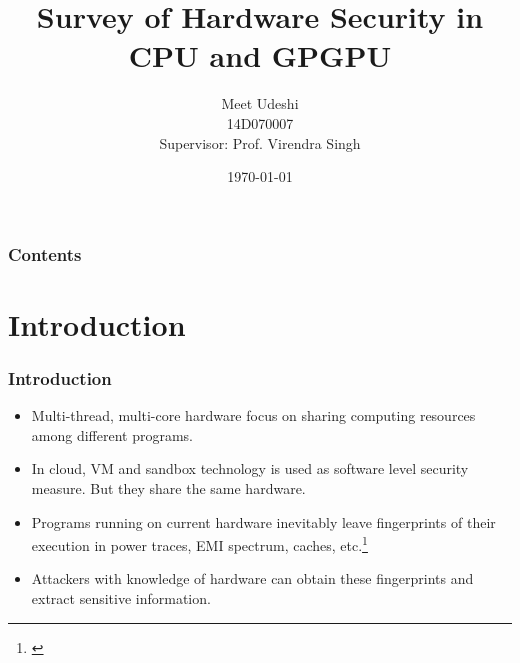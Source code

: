 \documentclass[10pt]{beamer}
\title[DDP Phase 1]{Survey of Hardware Security in CPU and GPGPU} %
\author{Meet Udeshi\\
14D070007\\
Supervisor: Prof. Virendra Singh} %
\institute[CADSL] %
{
CADSL - IIT Bombay\\ %
}
\date{\today} %
\begin{document}
\begin{frame}
\titlepage %
\end{frame}

\begin{frame}
\frametitle{Contents} %
\tableofcontents %
\end{frame}

\section{Introduction}


\begin{frame}
\frametitle{Introduction}
\begin{itemize}
    \item Multi-thread, multi-core hardware focus on sharing computing resources among different programs.
    \item In cloud, VM and sandbox technology is used as software level security measure. But they share the same hardware.
    \item Programs running on current hardware inevitably leave fingerprints of their execution in power traces, EMI spectrum,
        caches, etc.\footnote{\cite{side_channel_intro}}
    \item Attackers with knowledge of hardware can obtain these fingerprints and extract sensitive information.
\end{itemize}
\end{frame}
\end{document}
